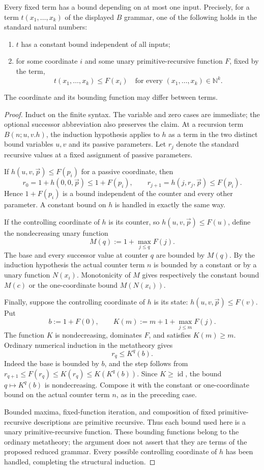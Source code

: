 \begin{theorem}
\label{seedless:one-coordinate}
Every fixed term has a bound depending on at most one input.
Precisely, for a term $t(x_1,\ldots,x_k)$ of the displayed $B$ grammar,
one of the following holds in the standard natural numbers:
\begin{enumerate}
 \item $t$ has a constant bound independent of all inputs;
 \item for some coordinate $i$ and some unary primitive-recursive
       function $F$, fixed by the term,
       \[
       t(x_1,\ldots,x_k)\le F(x_i)
       \quad\text{for every }(x_1,\ldots,x_k)\in\mathbb N^k.
       \]
\end{enumerate}
The coordinate and its bounding function may differ between terms.
\end{theorem}
\begin{proof}
Induct on the finite syntax. The variable and zero cases are immediate;
the optional successor abbreviation also preserves the claim. At a
recursion term $B(n;u,v.h)$, the induction hypothesis applies to $h$
as a term in the two distinct bound variables $u,v$ and its passive
parameters. Let $r_j$ denote the standard recursive values at a fixed
assignment of passive parameters.

If $h(u,v,\vec p)\le F(p_i)$ for a passive coordinate, then
\[
 r_0=1+h(0,0,\vec p)\le1+F(p_i),\qquad
 r_{j+1}=h(j,r_j,\vec p)\le F(p_i).
\]
Hence $1+F(p_i)$ is a bound independent of the counter and every other
parameter. A constant bound on $h$ is handled in exactly the same way.

If the controlling coordinate of $h$ is its counter, so
$h(u,v,\vec p)\le F(u)$, define the nondecreasing unary function
\[
                       M(q):=1+\max_{j\le q}F(j).
\]
The base and every successor value at counter $q$ are bounded by
$M(q)$. By the induction hypothesis the actual counter term $n$ is
bounded by a constant or by a unary function $N(x_i)$. Monotonicity of
$M$ gives respectively the constant bound $M(c)$ or the one-coordinate
bound $M(N(x_i))$.

Finally, suppose the controlling coordinate of $h$ is its state:
$h(u,v,\vec p)\le F(v)$. Put
\[
 b:=1+F(0),\qquad
 K(m):=m+1+\max_{j\le m}F(j).
\]
The function $K$ is nondecreasing, dominates $F$, and satisfies
$K(m)\ge m$. Ordinary numerical induction in the metatheory gives
\[
                          r_q\le K^q(b).
\]
Indeed the base is bounded by $b$, and the step follows from
$r_{q+1}\le F(r_q)\le K(r_q)\le K(K^q(b))$.
Since $K\ge\operatorname{id}$, the bound $q\mapsto K^q(b)$ is
nondecreasing. Compose it with the constant or one-coordinate bound
on the actual counter term $n$, as in the preceding case.

Bounded maxima, fixed-function iteration, and composition of fixed
primitive-recursive descriptions are primitive recursive. Thus each
bound used here is a unary primitive-recursive function. These bounding
functions belong to the ordinary metatheory; the argument does not
assert that they are terms of the proposed reduced grammar. Every
possible controlling coordinate of $h$ has been handled, completing
the structural induction.
\end{proof}
